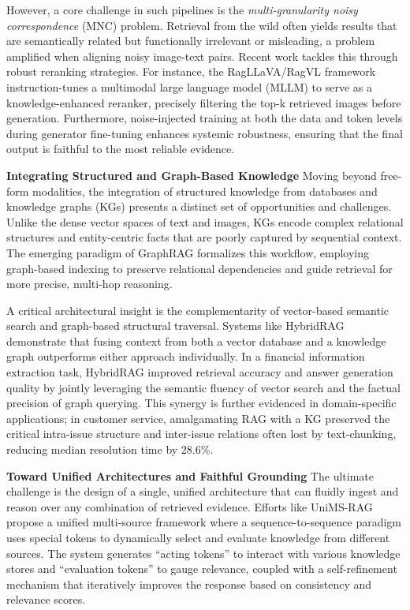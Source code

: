 \documentclass[11pt,a4paper]{article}
\begin{document}
However, a core challenge in such pipelines is the \emph{multi-granularity noisy correspondence} (MNC) problem. Retrieval from the wild often yields results that are semantically related but functionally irrelevant or misleading, a problem amplified when aligning noisy image-text pairs. Recent work tackles this through robust reranking strategies. For instance, the RagLLaVA/RagVL framework \cite{arxiv:2407.21439v2} instruction-tunes a multimodal large language model (MLLM) to serve as a knowledge-enhanced reranker, precisely filtering the top-k retrieved images before generation. Furthermore, noise-injected training at both the data and token levels during generator fine-tuning enhances systemic robustness, ensuring that the final output is faithful to the most reliable evidence.

\textbf{Integrating Structured and Graph-Based Knowledge}  
Moving beyond free-form modalities, the integration of structured knowledge from databases and knowledge graphs (KGs) presents a distinct set of opportunities and challenges. Unlike the dense vector spaces of text and images, KGs encode complex relational structures and entity-centric facts that are poorly captured by sequential context. The emerging paradigm of GraphRAG \cite{arxiv:2408.08921v2} formalizes this workflow, employing graph-based indexing to preserve relational dependencies and guide retrieval for more precise, multi-hop reasoning.

A critical architectural insight is the complementarity of vector-based semantic search and graph-based structural traversal. Systems like HybridRAG \cite{arxiv:2408.04948v1} demonstrate that fusing context from both a vector database and a knowledge graph outperforms either approach individually. In a financial information extraction task, HybridRAG improved retrieval accuracy and answer generation quality by jointly leveraging the semantic fluency of vector search and the factual precision of graph querying. This synergy is further evidenced in domain-specific applications; in customer service, amalgamating RAG with a KG \cite{arxiv:2404.17723v2} preserved the critical intra-issue structure and inter-issue relations often lost by text-chunking, reducing median resolution time by 28.6\%.

\textbf{Toward Unified Architectures and Faithful Grounding}  
The ultimate challenge is the design of a single, unified architecture that can fluidly ingest and reason over any combination of retrieved evidence. Efforts like UniMS-RAG \cite{arxiv:2401.13256v1} propose a unified multi-source framework where a sequence-to-sequence paradigm uses special tokens to dynamically select and evaluate knowledge from different sources. The system generates ``acting tokens'' to interact with various knowledge stores and ``evaluation tokens'' to gauge relevance, coupled with a self-refinement mechanism that iteratively improves the response based on consistency and relevance scores.
\end{document}
